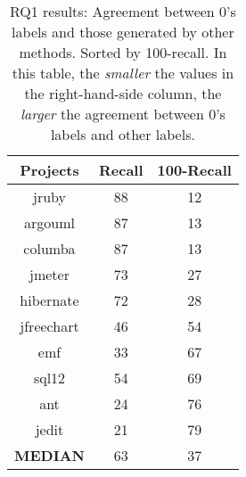 \begin{table}[!b]
\centering
\caption{RQ1 results:
Agreement between 
{\IT}0's labels and those
generated by other methods.
Sorted by 100-recall. In this table, the {\em smaller}
the values in the right-hand-side column, the {\em larger}
the agreement between {\IT}0's labels  and other labels.}
\label{table ensemble dt classifier}
\begin{tabular}{|c|c|c|}
\hline
\textbf{Projects} & %
\textbf{Recall} & \textbf{100-Recall}\\
\hline
jruby    & %
88 & 12 \\ \hline
argouml  & %
87 & 13 \\ \hline 
columba  & %
87 & 13 \\  \hline
jmeter   & %
73 & 27 \\ \hline
hibernate & %
72 & 28 \\ \hline 
jfreechart & %
46 & 54 \\ \hline
emf      & %
33 & 67 \\ \hline 
sql12    & %
54 & 69 \\  \hline  
ant      & %
24 & 76 \\ \hline
jedit    & %
21 & 79 \\ \hline
\textbf{MEDIAN} & %
63 & 37 \\
\hline
\end{tabular}

\end{table}